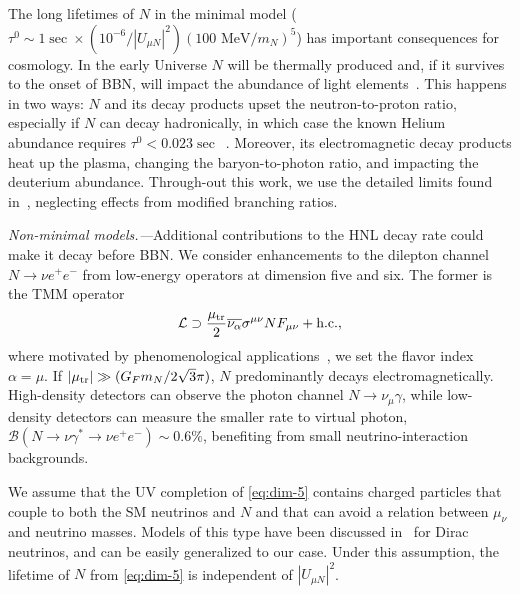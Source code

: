 \documentclass[
reprint,
superscriptaddress,
showpacs,
preprintnumbers,
bibnotes,
amsmath,
amssymb,
aps,
prd,
floatfix
]{revtex4-2}
\begin{document}
The long lifetimes of $N$ in the minimal model ($\tau^0 \sim \SI{1} \sec  \times (10^{-6}/|U_{\mu N}|^2)(100\text{ MeV}/m_N)^5$) has important consequences for cosmology.
In the early Universe $N$ will be thermally produced and, if it survives to the onset of BBN, will impact the abundance of light elements~\cite{Sarkar:1995dd,Dolgov:2000jw,Ruchayskiy:2012si,Hufnagel:2017dgo}.
This happens in two ways: $N$ and its decay products upset the neutron-to-proton ratio, especially if $N$ can decay hadronically, in which case the known Helium abundance requires $\tau^0 < 0.023\sec$~\cite{Boyarsky:2020dzc}.
Moreover, its electromagnetic decay products heat up the plasma, changing the baryon-to-photon ratio, and impacting the deuterium abundance. 
Through-out this work, we use the detailed limits found in~\cite{Sabti:2020yrt}, neglecting effects from modified branching ratios.

\emph{Non-minimal models.---}Additional contributions to the HNL decay rate could make it decay before BBN.
We consider enhancements to the dilepton channel $N\to\nu e^+e^-$ from low-energy operators at dimension five and six.
The former is the TMM operator
\begin{equation}\label{eq:dim-5}
    \mathcal{L} \supset \frac{\mu_{\rm tr}}{2} \overline{\nu_\alpha}\sigma^{\mu\nu}N F_{\mu\nu} + \text{h.c.},
\end{equation}
where motivated by phenomenological applications~\cite{Aparici:2009fh,Gninenko:2009ks,Gninenko:2010pr,Magill:2018jla,Shoemaker:2018vii,Brdar:2020quo,Vergani:2021tgc}, we set the flavor index $\alpha = \mu$.
If $|\mu_{\rm tr}| \gg (G_F m_N/ 2\sqrt{3}\pi)$, $N$ predominantly decays electromagnetically.
High-density detectors can observe the photon channel $N\to \nu_\mu \gamma$, while low-density detectors can measure the smaller rate to virtual photon, $\mathcal{B}(N\to \nu \gamma^* \to \nu e^+e^-)\sim 0.6\%$, benefiting from small neutrino-interaction backgrounds.

We assume that the UV completion of \cref{eq:dim-5} contains charged particles that couple to both the SM neutrinos and $N$ and that can avoid a relation between $\mu_\nu$ and neutrino masses.
Models of this type have been discussed in~\cite{Voloshin:1987qy,Barbieri:1988fh,Babu:1989px,Babu:1989wn,Leurer:1989hx} for Dirac neutrinos, and can be easily generalized to our case.
Under this assumption, the lifetime of $N$ from \cref{eq:dim-5} is independent of $|U_{\mu N}|^2$.
\end{document}
